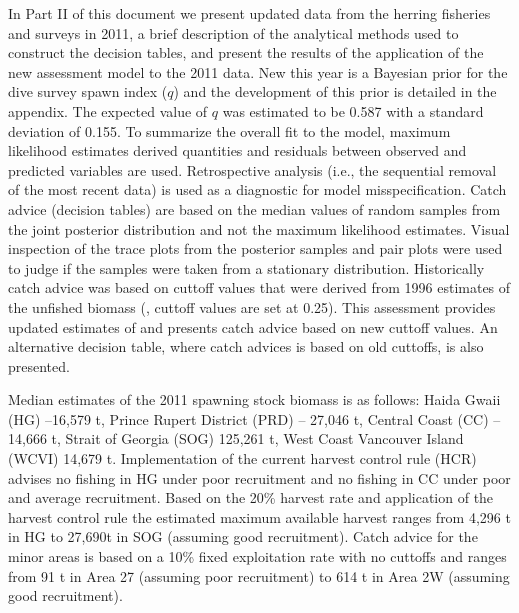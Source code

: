 In Part II of this document we present updated data from the herring fisheries and surveys in 2011, a brief description of the analytical methods used to construct the decision tables, and present the results of the application of the new assessment model to the 2011 data. New this year is a Bayesian prior for the dive survey spawn index ($q$) and the development of this prior is detailed in the appendix.  The expected value of $q$ was estimated to be 0.587 with a standard deviation of 0.155. To summarize the overall fit to the model, maximum likelihood estimates derived quantities and residuals between observed and predicted variables are used.  Retrospective analysis (i.e., the sequential removal of the most recent data) is used as a diagnostic for model misspecification.   Catch advice (decision tables) are based on the median values of random samples from the joint posterior distribution and not the maximum likelihood estimates.  Visual inspection of the trace plots from the posterior samples and pair plots were used to judge if the samples were taken from a stationary distribution. Historically catch advice was based on cuttoff values that were derived from 1996 estimates of the unfished biomass (\bo, cuttoff values are set at 0.25\bo).  This assessment provides updated estimates of \bo and presents catch advice based on new cuttoff values.  An alternative decision table, where catch advices is based on old cuttoffs, is also presented.  

Median estimates of the 2011 spawning stock biomass is as follows: Haida Gwaii (HG) --16,579 t, Prince Rupert District (PRD) -- 27,046 t, Central Coast (CC) -- 14,666 t, Strait of Georgia (SOG) 125,261 t, West Coast Vancouver Island (WCVI) 14,679 t.  Implementation of the current harvest control rule (HCR) advises no fishing in HG under poor recruitment and no fishing in CC under poor and average recruitment.  Based on the 20\% harvest rate and application of the harvest control rule the estimated maximum available harvest ranges from 4,296 t in HG to 27,690t in SOG (assuming good recruitment).  Catch advice for the minor areas is based on a 10\% fixed exploitation rate with no cuttoffs and ranges from 91 t in Area 27 (assuming poor recruitment) to 614 t in Area 2W (assuming good recruitment).


